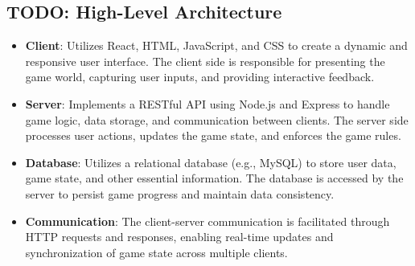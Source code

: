 \documentclass[12pt]{article}
\begin{document}
\subsection{TODO: High-Level Architecture}
\begin{itemize}
    \item \textbf{Client}: Utilizes React, HTML, JavaScript, and CSS to create a dynamic and responsive user interface. The client side is responsible for presenting the game world, capturing user inputs, and providing interactive feedback.
    \item \textbf{Server}: Implements a RESTful API using Node.js and Express to handle game logic, data storage, and communication between clients. The server side processes user actions, updates the game state, and enforces the game rules.
    \item \textbf{Database}: Utilizes a relational database (e.g., MySQL) to store user data, game state, and other essential information. The database is accessed by the server to persist game progress and maintain data consistency.
    \item \textbf{Communication}: The client-server communication is facilitated through HTTP requests and responses, enabling real-time updates and synchronization of game state across multiple clients.
\end{itemize}
\end{document}
